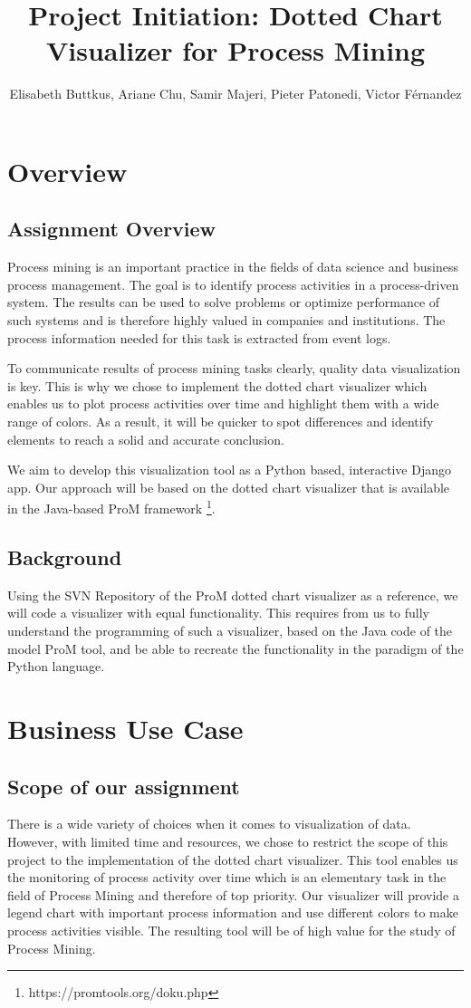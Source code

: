 \documentclass[a4paper,11pt]{scrartcl}
\title{Project Initiation: Dotted Chart Visualizer for Process Mining}
\author{Elisabeth Buttkus, Ariane Chu, Samir Majeri, Pieter Patonedi, Victor Férnandez }
\begin{document}
\maketitle

\section*{Overview}
\subsection*{Assignment Overview}
Process mining is an important practice in the fields of data science and business process management. The goal is to identify process activities in a process-driven system. The results can be used to solve problems or optimize performance of such systems and is therefore highly valued in companies and institutions. The process information needed for this task is extracted from event logs.

To communicate results of process mining tasks clearly, quality data visualization is key. This is why we chose to implement the dotted chart visualizer which enables us to plot process activities over time and highlight them with a wide range of colors. As a result, it will be quicker to spot differences and identify elements to reach a solid and accurate conclusion.

We aim to develop this visualization tool as a Python based, interactive Django app. Our approach will be based on the dotted chart visualizer that is available in the Java-based ProM framework \footnote{https://promtools.org/doku.php}.

\subsection*{Background}
Using the SVN Repository of the ProM dotted chart visualizer as a reference, we will code a visualizer with equal functionality. This requires from us to fully understand the programming of such a visualizer, based on the Java code of the model ProM tool, and be able to recreate the functionality in the paradigm of the Python language.   


\section*{Business Use Case}
\subsection*{Scope of our assignment}
There is a wide variety of choices when it comes to visualization of data. However, with limited time and resources, we chose to restrict the scope of this project to the implementation of the dotted chart visualizer. This tool enables us the monitoring of process activity over time which is an elementary task in the field of Process Mining and therefore of top priority. Our visualizer will provide a legend chart with important process information and use different colors to make process activities visible. The resulting tool will be of high value for the study of Process Mining.
\end{document}

